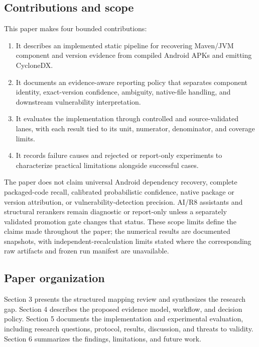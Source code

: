 \documentclass[10pt,twocolumn]{article}
\begin{document}
\subsection{Contributions and scope}
This paper makes four bounded contributions:
\begin{enumerate}
\item It describes an implemented static pipeline for recovering Maven/JVM
component and version evidence from compiled Android APKs and emitting CycloneDX.
\item It documents an evidence-aware reporting policy that separates component
identity, exact-version confidence, ambiguity, native-file handling, and downstream vulnerability interpretation.
\item It evaluates the implementation through controlled and source-validated
lanes, with each result tied to its unit, numerator, denominator, and coverage limits.
\item It records failure causes and rejected or report-only experiments to
characterize practical limitations alongside successful cases.
\end{enumerate}
The paper does not claim universal Android dependency recovery, complete packaged-code recall, calibrated probabilistic confidence, native package or version attribution, or vulnerability-detection precision. AI/R8 assistants and structural rerankers remain diagnostic or report-only unless a separately validated promotion gate changes that status. These scope limits define the claims made throughout the paper; the numerical results are documented snapshots, with independent-recalculation limits stated where the corresponding raw artifacts and frozen run manifest are unavailable.
\subsection{Paper organization}
Section 3 presents the structured mapping review and synthesizes the research gap. Section 4 describes the proposed evidence model, workflow, and decision policy. Section 5 documents the implementation and experimental evaluation, including research questions, protocol, results, discussion, and threats to validity. Section 6 summarizes the findings, limitations, and future work.
\end{document}
